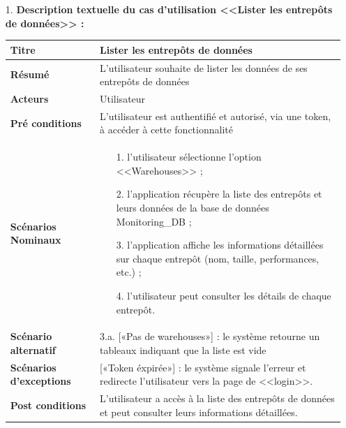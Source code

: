 \begin{enumerate}
    \item[1.] \textbf{Description textuelle du cas d'utilisation <<Lister les entrepôts de données>> :}
    \begin{table}[H]
        \centering
            \begin{tabular}{|p{3.5cm}|p{12cm}|}
                \hline \textbf{Titre} &  Lister les entrepôts de données \\
                \hline \textbf{Résumé} & L'utilisateur souhaite de lister les données de ses entrepôts de données \\
                \hline \textbf{Acteurs} & Utilisateur\\
                \hline \textbf{Pré conditions }& L'utilisateur est authentifié et autorisé, via une token, à accéder à cette fonctionnalité\\
                \hline \textbf{Scénarios Nominaux} &
                    \begin{enumerate}
                        \item [1.] l'utilisateur sélectionne l'option <<Warehouses>> ;
                        \item [2.] l'application récupère la liste des entrepôts et leurs données de la base de données Monitoring\_DB ;
                        \item [3.] l'application affiche les informations détaillées sur chaque entrepôt (nom, taille, performances, etc.) ;
                        \item [4.] l'utilisateur peut consulter les détails de chaque entrepôt.      
                    \end{enumerate}\\
                        \hline \textbf{Scénario alternatif} & 
                        3.a. \hspace{0.3cm} [«Pas de warehouses»] : le système retourne un tableaux indiquant que la liste est vide \newline\\
                \hline  \textbf{Scénarios d'exceptions} & 
                    [«Token éxpirée»] : le système signale l'erreur et redirecte l'utilisateur vers la page de <<login>>.\\
                \hline \textbf{Post conditions} & L'utilisateur a accès à la liste des entrepôts de données et peut consulter leurs informations détaillées.
         \\
                \hline
            \end{tabular}

\end{table}
\end{enumerate}
